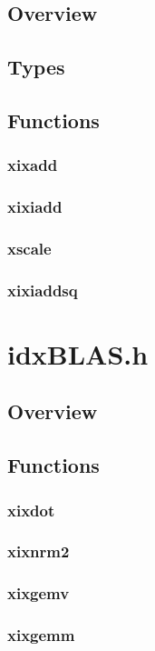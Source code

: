 \documentclass[12pt]{article}
\theoremstyle{plain}
\begin{document}
  \subsection{Overview}
  \subsection{Types}
  \subsection{Functions}
    \subsubsection{xixadd}
    \subsubsection{xixiadd}
    \subsubsection{xscale}
    \subsubsection{xixiaddsq}
\section{idxBLAS.h}
  \subsection{Overview}
  \subsection{Functions}
    \subsubsection{xixdot}
    \subsubsection{xixnrm2}
    \subsubsection{xixgemv}
    \subsubsection{xixgemm}
\end{document}
